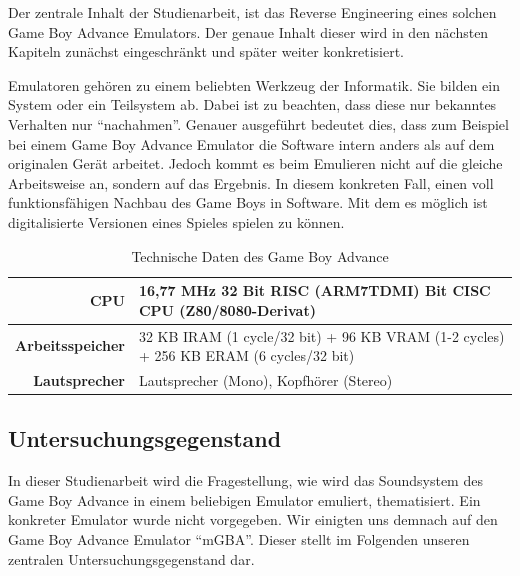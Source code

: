 \documentclass[11pt,a4paper]{scrartcl}
\begin{document}
Der zentrale Inhalt der Studienarbeit, ist das Reverse Engineering eines solchen Game Boy Advance Emulators. Der genaue Inhalt dieser wird in den n\"achsten Kapiteln zun\"achst eingeschr\"ankt und sp\"ater weiter konkretisiert.

Emulatoren geh\"oren zu einem beliebten Werkzeug der Informatik. Sie bilden ein System oder ein Teilsystem ab. Dabei ist zu beachten, dass diese nur bekanntes Verhalten nur \enquote{nachahmen}. Genauer ausgef\"uhrt bedeutet dies, dass zum Beispiel bei einem Game Boy Advance Emulator die Software intern anders als auf dem originalen Ger\"at arbeitet. Jedoch kommt es beim Emulieren nicht auf die gleiche Arbeitsweise an, sondern auf das Ergebnis. In diesem konkreten Fall, einen voll funktionsf\"ahigen Nachbau des Game Boys in Software. Mit dem es m\"oglich ist digitalisierte Versionen eines Spieles spielen zu k\"onnen.\newline

\begin{table}[h]
    \centering
    \begin{tabular}{ r | p{10cm} }
        \textbf{CPU} & 16,77 MHz 32 Bit RISC (ARM7TDMI)\newline
              8 Bit CISC CPU (Z80/8080-Derivat) \\
        \hline
        \textbf{Arbeitsspeicher} & 32 KB IRAM (1 cycle/32 bit)\newline
                          + 96 KB VRAM (1-2 cycles)\newline
                          + 256 KB ERAM (6 cycles/32 bit) \\
        \hline
        \textbf{Lautsprecher} & Lautsprecher (Mono), Kopfh\"orer (Stereo) \\
    \end{tabular}
    \caption{Technische Daten des Game Boy Advance\cite{GameBoyTechnischeDaten}}
    \label{table:TechnischeDaten}
\end{table}

\newpage

\subsection{Untersuchungsgegenstand}

In dieser Studienarbeit wird die Fragestellung, wie wird das Soundsystem des Game Boy Advance in einem beliebigen Emulator emuliert, thematisiert. Ein konkreter Emulator wurde nicht vorgegeben. Wir einigten uns demnach auf den Game Boy Advance Emulator \enquote{mGBA}. Dieser stellt im Folgenden unseren zentralen Untersuchungsgegenstand dar.
\end{document}
